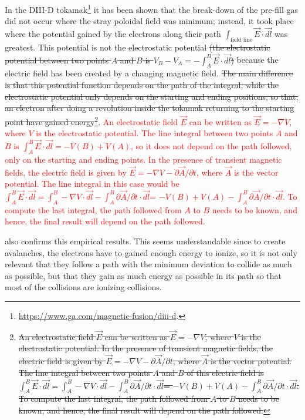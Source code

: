 \documentclass[a4paper,12pt,oneside]{book}
\newcommand{\p}{\partial}
\begin{document}
In the DIII-D tokamak\footnote{\url{https://www.ga.com/magnetic-fusion/diii-d}.} it has been shown \cite{Lazarus_1998} that the break-down of the pre-fill gas did not occur where the stray poloidal field was minimum; instead, it took place where the potential gained by the electrons along their path $\int_\text{field line} \vec{E} \cdot \vec{dl}$ was greatest. This potential is not the electrostatic potential \st{(the electrostatic potential between two points $A$ and $B$ is $V_B-V_A=- \int_A^B \vec{E} \cdot \vec{dl}$)} because the electric field has been created by a changing magnetic field. \st{The main difference is that this potential function depends on the path of the integral, while the electrostatic potential only depends on the starting and ending positions, so that, an electron after doing a revolution inside the tokamak returning to the starting point have gained energy}\footnote{\st{An electrostatic field $\vec{E}$ can be written as  $\vec{E}=-\nabla V$, where $V$ is the electrostatic potential. In the presence of transient magnetic fields, the electric field is given by $\vec{E}=-\nabla V- \p \vec{A}/ \p t$, where $\vec{A}$ is the vector potential. The line integral between two points $A$ and $B$ of this electric field is
$\int_A^B \vec{E} \cdot \vec{dl}=\int_A^B -\nabla V \cdot \vec{dl} -\int_A^B \p \vec{A}/ \p t \cdot \vec{dl}$= $-V(B)+V(A)-\int_A^B \p \vec{A}/ \p t \cdot \vec{dl}$. To compute the last integral, the path followed from $A$ to $B$ needs to be known, and hence, the final result will depend on the path followed.}}. \textcolor{red}{An electrostatic field $\vec{E}$ can be written as  $\vec{E}=-\nabla V$, where $V$ is the electrostatic potential. The line integral between two points $A$ and $B$ is $\int_A^B \vec{E} \cdot \vec{dl}=-V(B)+V(A)$, so it does not depend on the path followed, only on the starting and ending points. In the presence of transient magnetic fields, the electric field is given by $\vec{E}=-\nabla V- \p \vec{A}/ \p t$, where $\vec{A}$ is the vector potential. The line integral in this case would be
$\int_A^B \vec{E} \cdot \vec{dl}=\int_A^B -\nabla V \cdot \vec{dl} -\int_A^B \p \vec{A}/ \p t \cdot \vec{dl}$= $-V(B)+V(A)-\int_A^B \p \vec{A}/ \p t \cdot \vec{dl}$. To compute the last integral, the path followed from $A$ to $B$ needs to be known, and hence, the final result will depend on the path followed.}


\cite{NSTX_2017} also confirms this empirical results. This seems understandable since to create avalanches, the electrons have to gained enough energy to ionize, so it is not only relevant that they follow a path with the minimum deviation to collide as much as possible, but that they gain as much energy as possible in its path so that most of the collisions are ionizing collisions.
\end{document}
